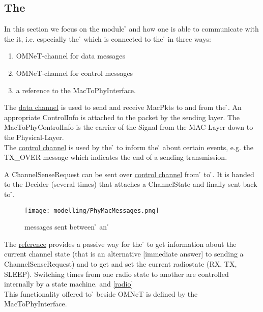 \subsection{The \bp}

In this section we focus on the module \h{\bp} and how one is able to communicate with the 
it, i.e. especially the \h{\bm} which is connected to the \h{\bp}
in three ways:

\begin{enumerate}
 \item OMNeT-channel for data messages
 \item OMNeT-channel for control messages
 \item a reference to the \h{MacToPhyInterface}.
\end{enumerate} 

The \underline{data channel} is used to send and receive
MacPkts to and
from the \h{\bp}. An appropriate ControlInfo is attached to the packet by the
sending layer. The \h{MacToPhyControlInfo} is the carrier of the Signal from the
MAC-Layer down to the Physical-Layer.
\\

The \underline{control channel} is used by the \h{\bp} to inform the \h{\bm}
about
certain events, e.g. the TX\_OVER message 
which indicates the end of a sending transmission.

A ChannelSenseRequest can be sent over \underline{control channel} from \h{\bm}
to \h{\bp}. It is handed to the Decider (several times) that attaches a
ChannelState and finally sent back to \h{\bm}.
\begin{figure}[H]
 \centering
 \texttt{[image: modelling/PhyMacMessages.png]}
 \caption{messages sent between \h{\bp} an \h{\bm}}
 \label{fig: PhyMacMessages}
\end{figure}


The \underline{reference} provides a passive way for the  \h{\bm} to 
get
information about the current channel state (that is an
alternative [immediate answer] to sending a ChannelSenseRequest) and to
get and set the current radiostate (RX,
TX,
SLEEP).
Switching times from one radio state to another are
controlled
internally by a state machine.  and \ref{radio}
\\
This functionality offered to \h{\bm} beside OMNeT is defined by the \h{MacToPhyInterface}.
\\

